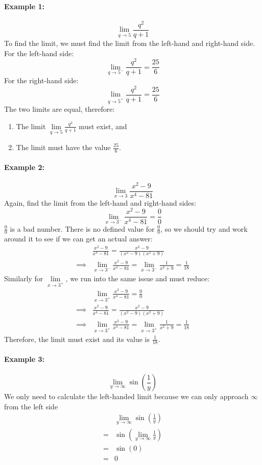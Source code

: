 \documentclass[../revisedMain.tex]{subfiles}
\begin{document}
\paragraph{Example 1:} \[\lim\limits_{q\to 5} \frac{q^2}{q+1}\] To find the limit, we must find the limit from the left-hand and right-hand side. For the left-hand side: \[\lim\limits_{q\to 5^-} \frac{q^2}{q+1}=\frac{25}{6}\] For the right-hand side: 
\[\lim\limits_{q\to 5^+} \frac{q^2}{q+1}=\frac{25}{6}\] The two limits are equal, therefore:
\begin{enumerate}\item The limit \(\lim\limits_{q\to 5} \displaystyle\frac{q^2}{q+1}\) must exist, and\item The limit must have the value \(\displaystyle\frac{25}{6}\).\end{enumerate}
\paragraph{Example 2:} \[\lim\limits_{x\to 3}\frac{x^2-9}{x^4-81}\] Again, find the limit from the left-hand and right-hand sides: \[\lim\limits_{x\to 3^-}\frac{x^2-9}{x^4-81}=\frac{0}{0}\] \(\displaystyle\frac{0}{0}\) is a bad number. There is no defined value for \(\displaystyle\frac{0}{0}\), so we should try and work around it to see if we can get an actual answer: 
\begin{equation}\begin{split}&\frac{x^2-9}{x^4-81}=\frac{x^2-9}{(x^2-9)(x^2+9)}\\\implies&\lim\limits_{x\to 3^-}\frac{x^2-9}{x^4-81}=\lim_{x\to 3^-}\frac{1}{x^2+9}=\frac{1}{18}\end{split}\end{equation}
Similarly for \(\lim\limits_{x\to 3^+}\), we run into the same issue and must reduce:
\begin{equation}\begin{split}&\lim\limits_{x\to 3^+}\frac{x^2-9}{x^4-81}=\frac{0}{0}\\\implies&\frac{x^2-9}{x^4-81}=\frac{x^2-9}{(x^2-9)(x^2+9)}\\\implies&\lim\limits_{x\to 3^+}\frac{x^2-9}{x^4-81}=\lim_{x\to 3^+}\frac{1}{x^2+9}=\frac{1}{18}\end{split}
\end{equation} Therefore, the limit must exist and its value is \(\displaystyle\frac{1}{18}\).
\paragraph{Example 3:} \[\lim_{y\to\infty}\sin\left(\frac{1}{y}\right)\] We only need to calculate the left-handed limit because we can only approach \(\infty\) from the left side 
\begin{equation}\begin{split}&\lim_{y\to\infty}\sin\left(\frac{1}{y}\right)\\=&\sin\left(\lim_{y\to\infty}\frac{1}{y}\right)\\=&\sin(0)\\=&0\end{split}\end{equation}
\newpage
\end{document}
